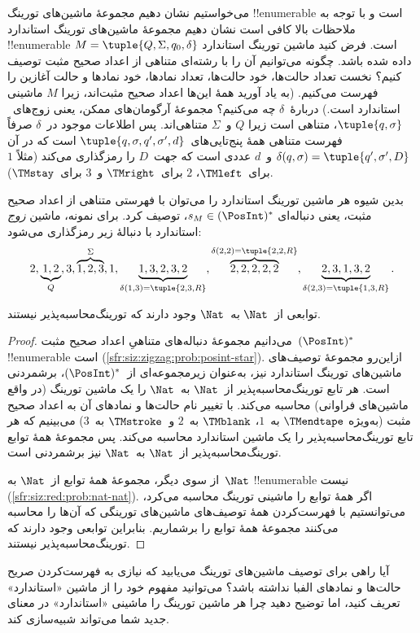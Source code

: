 \documentclass[../../../include/open-logic-section]{subfiles}
\begin{document}
\begin{explain}
می‌خواستیم نشان دهیم مجموعهٔ ماشین‌های تورینگ !!{enumerable} است و با
توجه به ملاحظات بالا کافی است نشان دهیم مجموعهٔ ماشین‌های تورینگ
استاندارد !!{enumerable} است. فرض کنید ماشین تورینگ استاندارد
$M=\tuple{Q,\Sigma,q_0,\delta}$ داده شده باشد. چگونه می‌توانیم آن را
با رشته‌ای متناهی از اعداد صحیح مثبت توصیف کنیم؟ نخست تعداد حالت‌ها،
خود حالت‌ها، تعداد نمادها، خود نمادها و حالت آغازین را فهرست می‌کنیم.
(به یاد آورید همهٔ این‌ها اعداد صحیح مثبت‌اند، زیرا $M$ ماشینی
استاندارد است.) دربارهٔ~$\delta$ چه می‌کنیم؟ مجموعهٔ آرگومان‌های ممکن،
یعنی زوج‌های~$\tuple{q,\sigma}$، متناهی است زیرا $Q$ و~$\Sigma$
متناهی‌اند. پس اطلاعات موجود در~$\delta$ صرفاً فهرست متناهی همهٔ
پنج‌تایی‌های~$\tuple{q,\sigma,q',\sigma',d}$ است که در آن
$\delta(q,\sigma)=\tuple{q',\sigma',D}$ و~$d$ عددی است که جهت~$D$ را
رمزگذاری می‌کند (مثلاً $1$ برای~$\TMleft$، $2$ برای~$\TMright$ و~$3$
برای~$\TMstay$).

بدین شیوه هر ماشین تورینگ استاندارد را می‌توان با فهرستی متناهی از
اعداد صحیح مثبت، یعنی دنباله‌ای
$s_M\in(\PosInt)^*$، توصیف کرد. برای نمونه، ماشین \emph{زوج}
استاندارد با دنبالهٔ زیر رمزگذاری می‌شود:
\[
2, \underbrace{1, 2}_Q, 3, \overbrace{1, 2, 3}^\Sigma, 1, \underbrace{1, 3, 2, 3, 2}_{\delta(1,3) = \tuple{2,3,R}},
\overbrace{2, 2, 2, 2, 2}^{\delta(2,2) = \tuple{2,2,R}},
\underbrace{2, 3, 1, 3, 2}_{\delta(2,3) = \tuple{1,3,R}}.
\]
\end{explain}

\begin{thm}
توابعی از~$\Nat$ به~$\Nat$ وجود دارند که تورینگ‌محاسبه‌پذیر نیستند.
\end{thm}

\begin{proof}
می‌دانیم مجموعهٔ دنباله‌های متناهیِ اعداد صحیح مثبت~$(\PosInt)^*$
!!{enumerable} است (\cref{sfr:siz:zigzag:prob:posint-star}). ازاین‌رو
مجموعهٔ توصیف‌های ماشین‌های تورینگ استاندارد نیز، به‌عنوان زیرمجموعه‌ای
از~$(\PosInt)^*$، برشمردنی است. هر تابع تورینگ‌محاسبه‌پذیر از~$\Nat$
به~$\Nat$ را یک ماشین تورینگ (در واقع ماشین‌های فراوانی) محاسبه
می‌کند. با تغییر نام حالت‌ها و نمادهای آن به اعداد صحیح مثبت (به‌ویژه
$\TMendtape$ به~$1$، $\TMblank$ به~$2$ و~$\TMstroke$ به~$3$) می‌بینیم
که هر تابع تورینگ‌محاسبه‌پذیر را یک ماشین استاندارد محاسبه می‌کند.
پس مجموعهٔ همهٔ توابع تورینگ‌محاسبه‌پذیر از~$\Nat$ به~$\Nat$ نیز
برشمردنی است.

از سوی دیگر، مجموعهٔ همهٔ توابع از~$\Nat$ به~$\Nat$ !!{enumerable}
نیست (\cref{sfr:siz:red:prob:nat-nat}). اگر همهٔ توابع را ماشینی
تورینگ محاسبه می‌کرد، می‌توانستیم با فهرست‌کردن همهٔ توصیف‌های
ماشین‌های تورینگی که آن‌ها را محاسبه می‌کنند مجموعهٔ همهٔ توابع را
برشماریم. بنابراین توابعی وجود دارند که تورینگ‌محاسبه‌پذیر نیستند.
\end{proof}

\begin{prob}
  آیا راهی برای توصیف ماشین‌های تورینگ می‌یابید که نیازی به
  فهرست‌کردن صریح حالت‌ها و نمادهای الفبا نداشته باشد؟ می‌توانید مفهوم
  خود را از ماشین «استاندارد» تعریف کنید، اما توضیح دهید چرا هر ماشین
  تورینگ را ماشینی «استاندارد» در معنای جدید شما می‌تواند شبیه‌سازی
  کند.
\end{prob}
\end{document}
